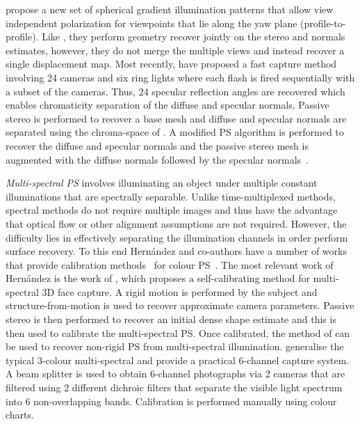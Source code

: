 \citet{ghosh2011multiview} propose a new set of spherical gradient
illumination patterns that allow view independent polarization
for viewpoints that lie along the yaw plane (profile-to-profile). Like
\citet{fyffe2011comprehensive}, they perform geometry recover jointly
on the stereo and normals estimates, however, they do not merge the multiple
views and instead recover a single displacement map. Most recently,
\citet{graham2015near} have proposed a fast capture method involving 24 cameras
and six ring lights where each flash is fired sequentially with a subset
of the cameras. Thus, 24 specular reflection angles are recovered which
enables chromaticity separation of the diffuse and specular normals. Passive
stereo is performed to recover a base mesh and diffuse and specular normals
are separated using the chroma-space of \citet{zickler2008color}. A modified
PS algorithm is performed to recover the diffuse and specular normals and
the passive stereo mesh is augmented with the diffuse normals followed
by the specular normals~\cite{nehab2005efficiently}.

\textit{Multi-spectral PS} involves illuminating an object under
multiple constant illuminations that are spectrally separable. Unlike
time-multiplexed methods, spectral methods do not require multiple images
and thus have the advantage that optical flow or other alignment assumptions
are not required. However, the difficulty lies in effectively separating the
illumination channels in order perform surface recovery. To this end
Hern{\'a}ndez and co-authors have a number of works that provide
calibration methods~\cite{vogiatzis2012self,hernandez2008multiview,brostow2011video}
for colour PS~\cite{drew1992shape}. The most relevant work of Hern{\'a}ndez
is the work of \citet{vogiatzis2012self}, which proposes a self-calibrating
method for multi-spectral 3D face capture. A rigid motion is performed by
the subject and structure-from-motion is used to recover approximate camera
parameters. Passive stereo is then performed to recover an initial dense
shape estimate and this is then used to calibrate the multi-spectral PS.\@
Once calibrated, the method of \citet{brostow2011video} can be used to
recover non-rigid PS from multi-spectral illumination.
\citet{fyffe2011single} generalise the typical 3-colour multi-spectral
and provide a practical 6-channel capture system. A beam splitter is used
to obtain 6-channel photographs via 2 cameras that are filtered using
2 different dichroic filters that separate the visible light spectrum
into 6 non-overlapping bands. Calibration is performed manually using colour
charts.


